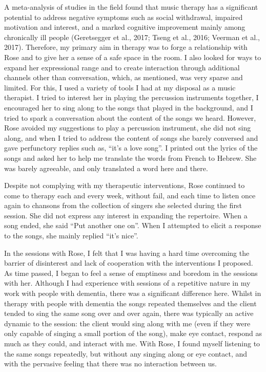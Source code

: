 \documentclass[authordate, empirical, issue]{jote-new-article}
\begin{document}
A meta-analysis of studies in the field found that music therapy has a significant potential to address negative symptoms such as social withdrawal, impaired motivation and interest, and a marked cognitive improvement mainly among chronically ill people (Geretsegger et al., 2017; Tseng et al., 2016; Veerman et al., 2017). Therefore, my primary aim in therapy was to forge a relationship with Rose and to give her a sense of a safe space in the room. I also looked for ways to expand her expressional range and to create interaction through additional channels other than conversation, which, as mentioned, was very sparse and limited. For this, I used a variety of tools I had at my disposal as a music therapist. I tried to interest her in playing the percussion instruments together, I encouraged her to sing along to the songs that played in the background, and I tried to spark a conversation about the content of the songs we heard. However, Rose avoided my suggestions to play a percussion instrument, she did not sing along, and when I tried to address the content of songs she barely conversed and gave perfunctory replies such as, “it's a love song”. I printed out the lyrics of the songs and asked her to help me translate the words from French to Hebrew. She was barely agreeable, and only translated a word here and there.



Despite not complying with my therapeutic interventions, Rose continued to come to therapy each and every week, without fail, and each time to listen once again to chansons from the collection of singers she selected during the first session. She did not express any interest in expanding the repertoire. When a song ended, she said “Put another one on”. When I attempted to elicit a response to the songs, she mainly replied “it's nice”.



In the sessions with Rose, I felt that I was having a hard time overcoming the barrier of disinterest and lack of cooperation with the interventions I proposed. As time passed, I began to feel a sense of emptiness and boredom in the sessions with her. Although I had experience with sessions of a repetitive nature in my work with people with dementia, there was a significant difference here. Whilst in therapy with people with dementia the songs repeated themselves and the client tended to sing the same song over and over again, there was typically an active dynamic to the session: the client would sing along with me (even if they were only capable of singing a small portion of the song), make eye contact, respond as much as they could, and interact with me. With Rose, I found myself listening to the same songs repeatedly, but without any singing along or eye contact, and with the pervasive feeling that there was no interaction between us.
\end{document}
